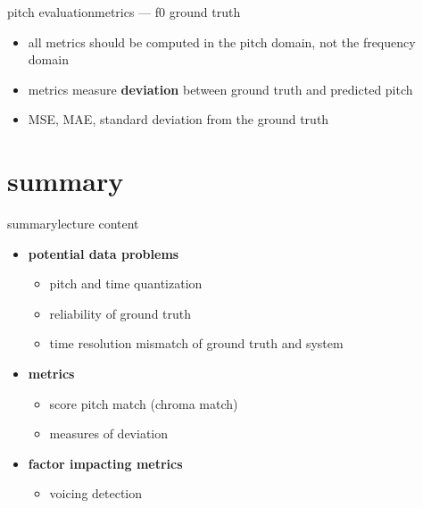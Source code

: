        \begin{frame}{pitch evaluation}{metrics --- f0 ground truth}
            \begin{itemize}
                \item   all metrics should be computed in the pitch domain, not the frequency domain
                \item   metrics measure \textbf{deviation} between ground truth and predicted pitch 
                \bigskip
                \item<2->   MSE, MAE, standard deviation from the ground truth
            \end{itemize}
       \end{frame}
     

    \section{summary}
        \begin{frame}{summary}{lecture content}
            \begin{itemize}
                \item   \textbf{potential data problems}
                    \begin{itemize}
                        \item   pitch and time quantization
                        \item   reliability of ground truth
                        \item   time resolution mismatch of ground truth and system
                    \end{itemize}
                \bigskip
                \item  \textbf{metrics}
                    \begin{itemize}
                        \item   score pitch match (chroma match)
                        \item   measures of deviation
                    \end{itemize}
                \bigskip
                \item      \textbf{factor impacting metrics}
                    \begin{itemize}
                        \item   voicing detection
                    \end{itemize}
            \end{itemize}
        \end{frame}

